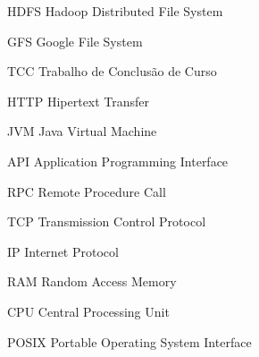 \begin{siglas}

  \item[HDFS] Hadoop Distributed File System
  \item[GFS] Google File System
  \item[TCC] Trabalho de Conclusão de Curso
  \item[HTTP] Hipertext Transfer
  \item[JVM] Java Virtual Machine
  \item[API] Application Programming Interface
  \item[RPC] Remote Procedure Call
  \item[TCP] Transmission Control Protocol
  \item[IP] Internet Protocol
  \item[RAM] Random Access Memory
  \item[CPU] Central Processing Unit
  \item[POSIX] Portable Operating System Interface

\end{siglas}
